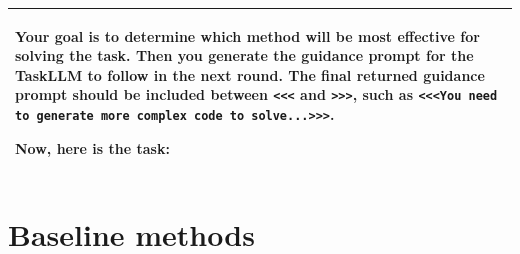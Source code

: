 \begin{table}[htbp]
\begin{tabularx}{\linewidth}{X}
    \textbf{Your goal is to determine which method will be most effective for solving the task.} Then you generate the guidance prompt for the TaskLLM to follow in the next round. The final returned guidance prompt should be included between {\color{AnswerRed}\texttt{<<<}} and {\color{AnswerRed}\texttt{>>>}}, such as {\color{AnswerRed}\texttt{<<<You need to generate more complex code to solve...>>>}}.
    \vspace{1em}

    Now, here is the task: \\
    \bottomrule
  \end{tabularx}
\end{table}

\newpage
\section{Baseline methods}
\label{appendix sec: Baseline methods}

